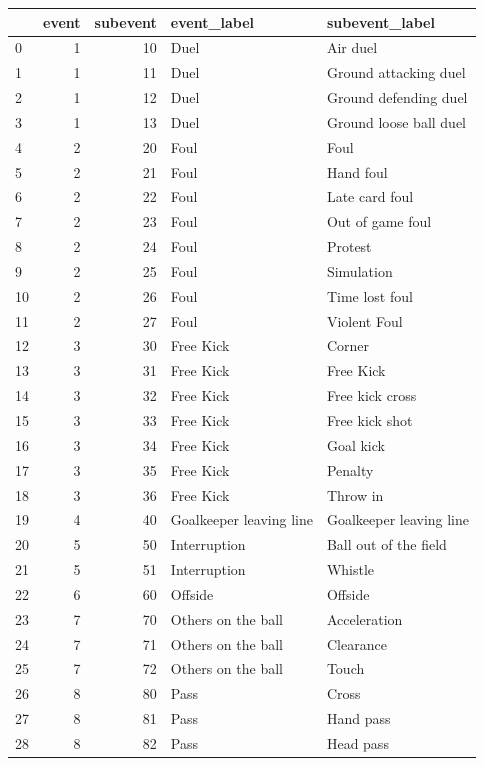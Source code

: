 \begin{table}[htbp]
\centering
\small
\setlength{\tabcolsep}{3pt}
\begin{tabular}{lrrll}

\toprule
 & event & subevent & event\_label & subevent\_label \\
\midrule
0 & 1 & 10 & Duel & Air duel \\
1 & 1 & 11 & Duel & Ground attacking duel \\
2 & 1 & 12 & Duel & Ground defending duel \\
3 & 1 & 13 & Duel & Ground loose ball duel \\
4 & 2 & 20 & Foul & Foul \\
5 & 2 & 21 & Foul & Hand foul \\
6 & 2 & 22 & Foul & Late card foul \\
7 & 2 & 23 & Foul & Out of game foul \\
8 & 2 & 24 & Foul & Protest \\
9 & 2 & 25 & Foul & Simulation \\
10 & 2 & 26 & Foul & Time lost foul \\
11 & 2 & 27 & Foul & Violent Foul \\
12 & 3 & 30 & Free Kick & Corner \\
13 & 3 & 31 & Free Kick & Free Kick \\
14 & 3 & 32 & Free Kick & Free kick cross \\
15 & 3 & 33 & Free Kick & Free kick shot \\
16 & 3 & 34 & Free Kick & Goal kick \\
17 & 3 & 35 & Free Kick & Penalty \\
18 & 3 & 36 & Free Kick & Throw in \\
19 & 4 & 40 & Goalkeeper leaving line & Goalkeeper leaving line \\
20 & 5 & 50 & Interruption & Ball out of the field \\
21 & 5 & 51 & Interruption & Whistle \\
22 & 6 & 60 & Offside & Offside \\
23 & 7 & 70 & Others on the ball & Acceleration \\
24 & 7 & 71 & Others on the ball & Clearance \\
25 & 7 & 72 & Others on the ball & Touch \\
26 & 8 & 80 & Pass & Cross \\
27 & 8 & 81 & Pass & Hand pass \\
28 & 8 & 82 & Pass & Head pass \\

\end{tabular}
\end{table}

